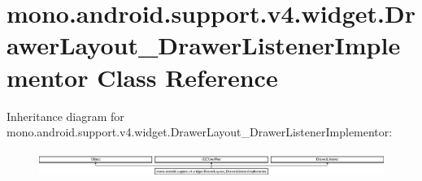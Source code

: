 \hypertarget{classmono_1_1android_1_1support_1_1v4_1_1widget_1_1DrawerLayout__DrawerListenerImplementor}{}\section{mono.\+android.\+support.\+v4.\+widget.\+Drawer\+Layout\+\_\+\+Drawer\+Listener\+Implementor Class Reference}
\label{classmono_1_1android_1_1support_1_1v4_1_1widget_1_1DrawerLayout__DrawerListenerImplementor}
Inheritance diagram for mono.\+android.\+support.\+v4.\+widget.\+Drawer\+Layout\+\_\+\+Drawer\+Listener\+Implementor\+:\begin{figure}[H]
\begin{center}
\leavevmode
\includegraphics[height=0.837070cm]{classmono_1_1android_1_1support_1_1v4_1_1widget_1_1DrawerLayout__DrawerListenerImplementor}
\end{center}
\end{figure}
